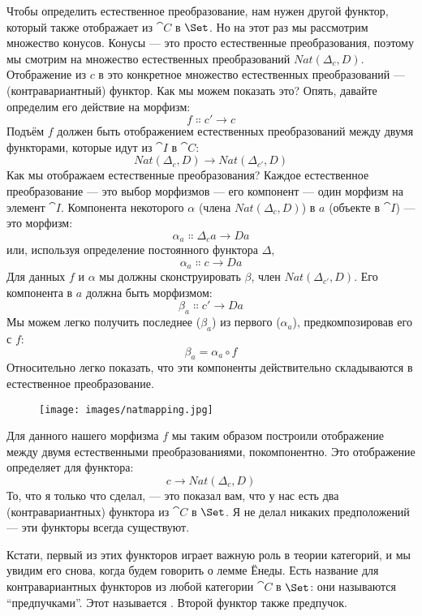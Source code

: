 \noindent
Чтобы определить естественное преобразование, нам нужен другой функтор, который также
отображает из $\cat{C}$ в $\Set$. Но на этот раз мы рассмотрим
множество конусов. Конусы --- это просто естественные преобразования, поэтому мы смотрим
на множество естественных преобразований $\mathit{Nat}(\Delta_c, D)$. Отображение
из $c$ в это конкретное множество естественных преобразований ---
(контравариантный) функтор. Как мы можем показать это? Опять, давайте определим его
действие на морфизм:
\[f \Colon c' \to c\]
Подъём $f$ должен быть отображением естественных преобразований
между двумя функторами, которые идут из $\cat{I}$ в $\cat{C}$:
\[\mathit{Nat}(\Delta_c, D) \to \mathit{Nat}(\Delta_{c'}, D)\]
Как мы отображаем естественные преобразования? Каждое естественное преобразование --- это
выбор морфизмов --- его компонент --- один морфизм на элемент
$\cat{I}$. Компонента некоторого $\alpha$ (члена $\mathit{Nat}(\Delta_c, D)$) в
$a$ (объекте в $\cat{I}$) --- это морфизм:
\[\alpha_a \Colon \Delta_c a \to D a\]
или, используя определение постоянного функтора $\Delta$,
\[\alpha_a \Colon c \to D a\]
Для данных $f$ и $\alpha$ мы должны сконструировать $\beta$, член
$\mathit{Nat}(\Delta_{c'}, D)$. Его компонента в $a$ должна быть
морфизмом:
\[\beta_a \Colon c' \to D a\]
Мы можем легко получить последнее ($\beta_a$) из первого ($\alpha_a$), предкомпозировав его с
$f$:
\[\beta_a = \alpha_a \circ f\]
Относительно легко показать, что эти компоненты действительно складываются в
естественное преобразование.

\begin{figure}[H]
  \centering
  \texttt{[image: images/natmapping.jpg]}
\end{figure}

\noindent
Для данного нашего морфизма $f$ мы таким образом построили отображение между двумя
естественными преобразованиями, покомпонентно. Это отображение определяет
 для функтора:
\[c \to \mathit{Nat}(\Delta_c, D)\]
То, что я только что сделал, --- это показал вам, что у нас есть два (контравариантных)
функтора из $\cat{C}$ в $\Set$. Я не делал никаких предположений
--- эти функторы всегда существуют.

Кстати, первый из этих функторов играет важную роль в
теории категорий, и мы увидим его снова, когда будем говорить о
лемме Ёнеды. Есть название для контравариантных функторов из любой категории
$\cat{C}$ в $\Set$: они называются ``предпучками''. Этот
называется . Второй функтор также
предпучок.

